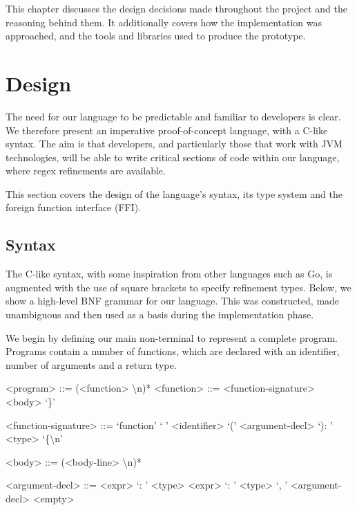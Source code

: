 \documentclass[a4paper,openany,12pt]{book}
\begin{document}
This chapter discusses the design decisions made throughout the project and the reasoning behind them.
It additionally covers how the implementation was approached, and the tools and libraries used to produce the prototype.

\section{Design}

The need for our language to be predictable and familiar to developers is clear.
We therefore present an imperative proof-of-concept language, with a C-like syntax.
The aim is that developers, and particularly those that work with JVM technologies, will be able to write critical
sections of code within our language, where regex refinements are available.

This section covers the design of the language's syntax, its type system and the foreign function interface (FFI).

\subsection{Syntax}

The C-like syntax, with some inspiration from other languages such as Go, is augmented with the use of square brackets
to specify refinement types.
Below, we show a high-level BNF grammar for our language.
This was constructed, made unambiguous and then used as a basis during the implementation phase.

\setlength{\grammarparsep}{20pt plus 1pt minus 1pt} %
\setlength{\grammarindent}{12em} %

We begin by defining our main non-terminal to represent a complete program.
Programs contain a number of functions, which are declared with an identifier, number of arguments and a return type.

\begin{grammar}
    <program> ::= (<function> \textbackslash n)*
    <function> ::= <function-signature> <body> `\}'

    <function-signature> ::= `function' ` ' <identifier> `(' <argument-decl> `): ' <type> `\{\textbackslash n'

    <body> ::= (<body-line> \textbackslash n)*

    <argument-decl> ::= <expr> `: ' <type>
    \alt <expr> `: ' <type> `, ' <argument-decl>
    \alt <empty>
\end{grammar}
\end{document}
